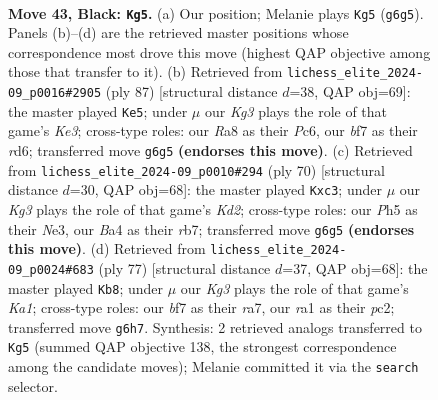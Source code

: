 \documentclass[11pt]{article}
\begin{document}
\clearpage

\begin{figure}[p]\centering
\begin{subfigure}{0.46\textwidth}\centering
\resizebox{\linewidth}{!}{%
\newchessgame
\chessboard[
  setfen={r7/1p3B2/p5k1/4P2p/bP1r4/P6K/8/R4R2 b - - 0 43},
  showmover=false,
  pgfstyle=straightmove, color=movearrow, markmove={g6-g5}
]}
\caption{}
\end{subfigure}\hfill
\begin{subfigure}{0.46\textwidth}\centering
\resizebox{\linewidth}{!}{%
\newchessgame
\chessboard[
  setfen={8/8/2pRkp2/1p6/4P3/r5Pp/2r5/3R3K b - - 1 44},
  showmover=false,
  pgfstyle=straightmove, color=movearrow, markmove={e6-e5}
]}
\caption{}
\end{subfigure}
\\[4pt]
\begin{subfigure}{0.46\textwidth}\centering
\resizebox{\linewidth}{!}{%
\newchessgame
\chessboard[
  setfen={1r4k1/1r5p/8/2p5/2P1p3/RPb1N2P/3K4/8 w - - 0 36},
  showmover=false,
  pgfstyle=straightmove, color=movearrow, markmove={d2-c3}
]}
\caption{}
\end{subfigure}\hfill
\begin{subfigure}{0.46\textwidth}\centering
\resizebox{\linewidth}{!}{%
\newchessgame
\chessboard[
  setfen={k7/R6R/2pp4/5p2/2r5/8/P1PK2PP/1r6 b - - 0 39},
  showmover=false,
  pgfstyle=straightmove, color=movearrow, markmove={a8-b8}
]}
\caption{}
\end{subfigure}
\caption{\textbf{Move 43, Black: \texttt{Kg5}.} (a) Our position; Melanie plays \texttt{Kg5} (\texttt{g6g5}). Panels (b)--(d) are the retrieved master positions whose correspondence most drove this move (highest QAP objective among those that transfer to it). (b) Retrieved from \texttt{lichess\_elite\_2024-09\_p0016\#2905} (ply 87) [structural distance $d$=38, QAP obj=69]: the master played \texttt{Ke5}; under $\mu$ our \emph{Kg3} plays the role of that game's \emph{Ke3}; cross-type roles: our \emph{R}a8 as their \emph{P}c6, our \emph{b}f7 as their \emph{r}d6; transferred move \texttt{g6g5} \textbf{(endorses this move)}. (c) Retrieved from \texttt{lichess\_elite\_2024-09\_p0010\#294} (ply 70) [structural distance $d$=30, QAP obj=68]: the master played \texttt{Kxc3}; under $\mu$ our \emph{Kg3} plays the role of that game's \emph{Kd2}; cross-type roles: our \emph{P}h5 as their \emph{N}e3, our \emph{B}a4 as their \emph{r}b7; transferred move \texttt{g6g5} \textbf{(endorses this move)}. (d) Retrieved from \texttt{lichess\_elite\_2024-09\_p0024\#683} (ply 77) [structural distance $d$=37, QAP obj=68]: the master played \texttt{Kb8}; under $\mu$ our \emph{Kg3} plays the role of that game's \emph{Ka1}; cross-type roles: our \emph{b}f7 as their \emph{r}a7, our \emph{r}a1 as their \emph{p}c2; transferred move \texttt{g6h7}. Synthesis: 2 retrieved analogs transferred to \texttt{Kg5} (summed QAP objective 138, the strongest correspondence among the candidate moves); Melanie committed it via the \texttt{search} selector.}
\label{fig:thought-m85}
\end{figure}
\end{document}
